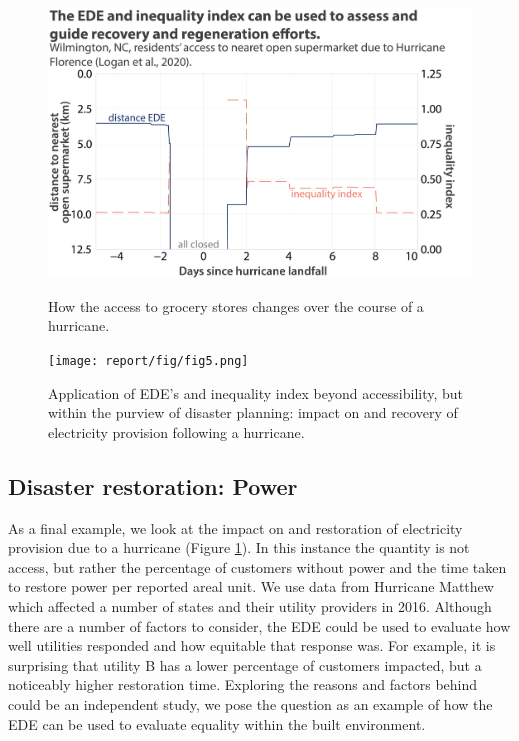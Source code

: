 \documentclass[final,3p,times,onecolumn,sort&compress]{elsarticle}
\begin{document}

\begin{figure}[!bp]
  \centering
  \begin{minipage}[b]{0.45\textwidth}
    \includegraphics[width=1\linewidth]{report/fig/fig4.png}
    \caption{
    How the access to grocery stores changes over the course of a hurricane.
    }
    \label{fig:florence}
  \end{minipage}
  \hfill
  \begin{minipage}[b]{0.45\textwidth}
    \texttt{[image: report/fig/fig5.png]}
    \caption{
    Application of EDE's and inequality index beyond accessibility, but within the purview of disaster planning: impact on and recovery of electricity provision following a hurricane.
    }
    \label{fig:electricity}
  \end{minipage}
\end{figure}


\subsection{Disaster restoration: Power}
As a final example, we look at the impact on and restoration of electricity provision due to a hurricane (Figure \ref{fig:electricity}).
In this instance the quantity is not access, but rather the percentage of customers without power and the time taken to restore power per reported areal unit.
We use data from Hurricane Matthew which affected a number of states and their utility providers in 2016.
Although there are a number of factors to consider, the EDE could be used to evaluate how well utilities responded and how equitable that response was. 
For example, it is surprising that utility B has a lower percentage of customers impacted, but a noticeably higher restoration time.
Exploring the reasons and factors behind could be an independent study, we pose the question as an example of how the EDE can be used to evaluate equality within the built environment.
\end{document}
